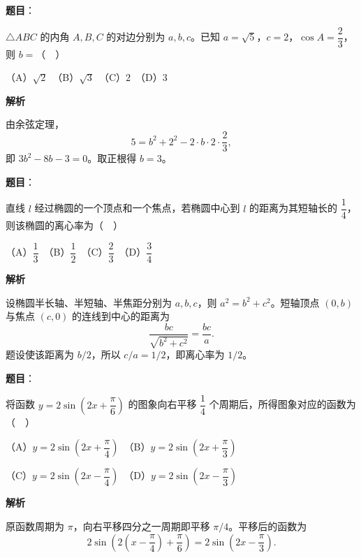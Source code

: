 \begin{answer}

\textbf{题目}：

\(\triangle ABC\) 的内角 \(A,B,C\) 的对边分别为 \(a,b,c\)。已知 \(a=\sqrt{5}\)，\(c=2\)，\(\cos A=\dfrac{2}{3}\)，则 \(b=\)（　）

   （A）\(\sqrt{2}\)　（B）\(\sqrt{3}\)　（C）\(2\)　（D）\(3\)

\textbf{解析}

由余弦定理，
\nopagebreak[4]
\[
5=b^2+2^2-2\cdot b\cdot2\cdot\frac23,
\]
即 \(3b^2-8b-3=0\)。取正根得 \(b=3\)。


\end{answer}
\begin{answer}

\textbf{题目}：

直线 \(l\) 经过椭圆的一个顶点和一个焦点，若椭圆中心到 \(l\) 的距离为其短轴长的 \(\dfrac{1}{4}\)，则该椭圆的离心率为（　）

   （A）\(\dfrac{1}{3}\)　（B）\(\dfrac{1}{2}\)　（C）\(\dfrac{2}{3}\)　（D）\(\dfrac{3}{4}\)

\textbf{解析}

设椭圆半长轴、半短轴、半焦距分别为 \(a,b,c\)，则 \(a^2=b^2+c^2\)。短轴顶点 \((0,b)\) 与焦点 \((c,0)\) 的连线到中心的距离为
\nopagebreak[4]
\[
\frac{bc}{\sqrt{b^2+c^2}}=\frac{bc}{a}.
\]
题设使该距离为 \(b/2\)，所以 \(c/a=1/2\)，即离心率为 \(1/2\)。


\end{answer}
\begin{answer}

\textbf{题目}：

将函数 \(y=2\sin\left(2x+\dfrac{\pi}{6}\right)\) 的图象向右平移 \(\dfrac{1}{4}\) 个周期后，所得图象对应的函数为（　）

   （A）\(y=2\sin\left(2x+\dfrac{\pi}{4}\right)\)　（B）\(y=2\sin\left(2x+\dfrac{\pi}{3}\right)\)

   （C）\(y=2\sin\left(2x-\dfrac{\pi}{4}\right)\)　（D）\(y=2\sin\left(2x-\dfrac{\pi}{3}\right)\)

\textbf{解析}

原函数周期为 \(\pi\)，向右平移四分之一周期即平移 \(\pi/4\)。平移后的函数为
\nopagebreak[4]
\[
2\sin\left(2(x-\frac\pi4)+\frac\pi6\right)
=2\sin(2x-\frac\pi3).
\]


\end{answer}
